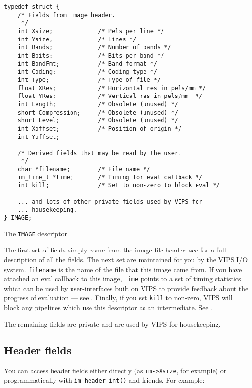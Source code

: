 \begin{fig2}
\begin{verbatim}
typedef struct {
    /* Fields from image header.
     */
    int Xsize;             /* Pels per line */
    int Ysize;             /* Lines */
    int Bands;             /* Number of bands */
    int Bbits;             /* Bits per band */
    int BandFmt;           /* Band format */
    int Coding;            /* Coding type */
    int Type;              /* Type of file */
    float XRes;            /* Horizontal res in pels/mm */
    float YRes;            /* Vertical res in pels/mm  */
    int Length;            /* Obsolete (unused) */
    short Compression;     /* Obsolete (unused) */
    short Level;           /* Obsolete (unused) */
    int Xoffset;           /* Position of origin */    
    int Yoffset;
   
    /* Derived fields that may be read by the user. 
     */
    char *filename;        /* File name */
    im_time_t *time;       /* Timing for eval callback */
    int kill;              /* Set to non-zero to block eval */

    ... and lots of other private fields used by VIPS for 
    ... housekeeping.
} IMAGE;
\end{verbatim}
\caption{The \texttt{IMAGE} descriptor}
\label{fg:image}
\end{fig2}

The first set of fields simply come from the image file header:
see  for a full description of all the fields. The next
set are maintained for you by the VIPS I/O system. \verb+filename+ is the
name of the file that this image came from.  If you have attached an eval
callback to this image, \verb+time+ points to a set of timing statistics
which can be used by user-interfaces built on VIPS to provide feedback
about the progress of evaluation --- see . Finally, if you
set \verb+kill+ to non-zero, VIPS will block any pipelines which use this
descriptor as an intermediate. See .

The remaining fields are private and are used by VIPS for housekeeping.

\subsection{Header fields}
\label{sec:fields}

You can access header fields either directly (as \verb+im->Xsize+, for
example) or programmatically with \verb+im_header_int()+ and friends. For
example:


